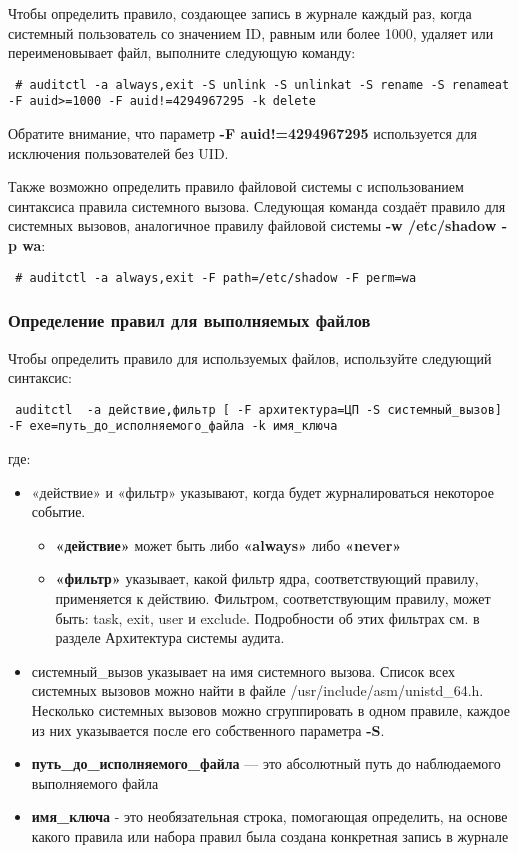 \documentclass[a4paper,10pt,twoside]{article}
\begin{document}
Чтобы определить правило, создающее запись в журнале каждый раз, когда системный пользователь со значением ID, равным или более 1000, удаляет или переименовывает файл, выполните следующую команду:
\begin{verbatim}
 # auditctl -a always,exit -S unlink -S unlinkat -S rename -S renameat -F auid>=1000 -F auid!=4294967295 -k delete
\end{verbatim} 
Обратите внимание, что параметр \textbf{-F auid!=4294967295} используется для исключения пользователей без UID.

Также возможно определить правило файловой системы с использованием синтаксиса правила системного вызова. Следующая команда создаёт правило для системных вызовов, аналогичное правилу файловой системы \textbf{-w /etc/shadow -p wa}:

\begin{verbatim}
 # auditctl -a always,exit -F path=/etc/shadow -F perm=wa
\end{verbatim} 


\subsubsection{Определение правил для выполняемых файлов}

Чтобы определить правило для используемых файлов, используйте следующий синтаксис:
\begin{verbatim}
 auditctl  -a действие,фильтр [ -F архитектура=ЦП -S системный_вызов] -F exe=путь_до_исполняемого_файла -k имя_ключа
\end{verbatim} 

где:

\begin{itemize}
 \item «действие» и «фильтр» указывают, когда будет журналироваться некоторое событие.
 \begin{itemize}
  \item \textbf{«действие»} может быть либо \textbf{«always»} либо \textbf{«never»}
\item \textbf{«фильтр»} указывает, какой фильтр ядра, соответствующий правилу, применяется к действию. Фильтром, соответствующим правилу, может быть:  task, exit, user и exclude. Подробности об этих фильтрах см. в разделе Архитектура системы аудита.
 \end{itemize}
\item системный\_вызов указывает на имя системного вызова. Список всех системных вызовов можно найти в файле /usr/include/asm/unistd\_64.h. Несколько системных вызовов можно сгруппировать в одном правиле, каждое из них указывается после его собственного параметра \textbf{-S}.
\item \textbf{путь\_до\_исполняемого\_файла} — это абсолютный путь до наблюдаемого выполняемого файла
\item \textbf{имя\_ключа} - это необязательная строка, помогающая определить, на основе какого правила или набора правил была создана конкретная запись в журнале
\end{itemize}
\end{document}
